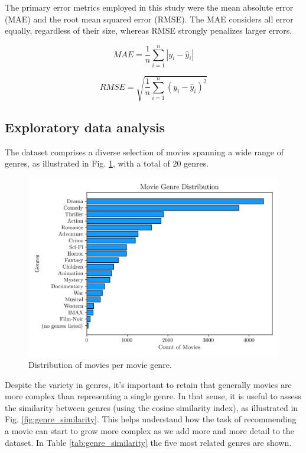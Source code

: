 \documentclass[conference]{IEEEtran}
\begin{document}
The primary error metrics employed in this study were the mean absolute error (MAE) and the root mean squared error (RMSE). The MAE considers all error equally, regardless of their size, whereas RMSE strongly penalizes larger errors.

\begin{equation}
MAE = \frac{1}{n}\sum^n_{i=1}|y_i-\hat{y}_i|
\end{equation}

\begin{equation}
RMSE = \sqrt{\frac{1}{n}\sum^{n}_{i=1}(y_i - \hat{y}_i)^2}
\end{equation}

\subsection{Exploratory data analysis}

The dataset comprises a diverse selection of movies spanning a wide range of genres, as illustrated in Fig. \ref{fig:genre_distribution}, with a total of 20 genres.

\begin{figure}[H]
    \centering
    \includegraphics[width=1\linewidth]{assets/genre_distribution.png}
    \caption{Distribution of movies per movie genre.}
    \label{fig:genre_distribution}
\end{figure}

Despite the variety in genres, it's important to retain that generally movies are more complex than representing a single genre. In that sense, it is useful to assess the similarity between genres (using the cosine similarity index), as illustrated in Fig. \ref{fig:genre_similarity}. This helps understand how the task of recommending a movie can start to grow more complex as we add more and more detail to the dataset. In Table \ref{tab:genre_similarity} the five most related genres are shown.
\end{document}
